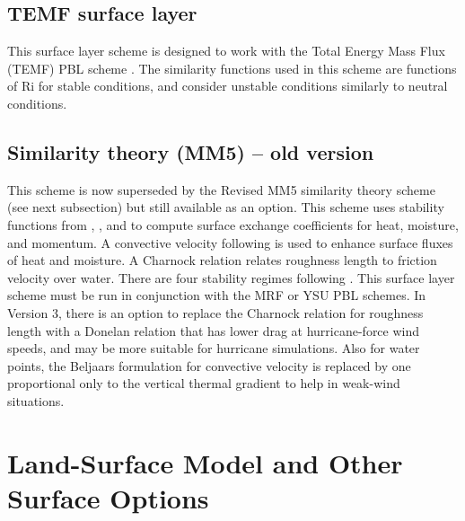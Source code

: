 \subsection{TEMF surface layer}

This surface layer scheme is designed to work with the Total Energy Mass Flux (TEMF) PBL scheme
\citep{angevine10}. The similarity functions used in this scheme are functions of Ri for stable conditions,
and consider unstable conditions similarly to neutral conditions.

\subsection{Similarity theory (MM5) -- old version}

This scheme is now superseded by the Revised MM5 similarity theory scheme
(see next subsection) but still available as an option.
This scheme uses stability functions from \citet{paulson70}, \citet{dyer70}, 
and \citet{webb70}
to compute surface exchange coefficients for heat, moisture, and momentum. 
A convective velocity following \citet{beljaars94} is used to enhance surface 
fluxes of heat and moisture. A Charnock relation relates 
roughness length to friction velocity over water. There are four stability 
regimes following \citet{zhanganthes82}.
This surface layer scheme must be run in conjunction with the MRF or
YSU PBL schemes. In Version 3, there is an option to replace the Charnock
relation for roughness length with a Donelan relation that has lower
drag at hurricane-force wind speeds, and may be more suitable for hurricane
simulations. Also for water points, the Beljaars formulation for convective
velocity is replaced by one proportional only to the vertical thermal gradient
to help in weak-wind situations.



\section{Land-Surface Model and Other Surface Options}

